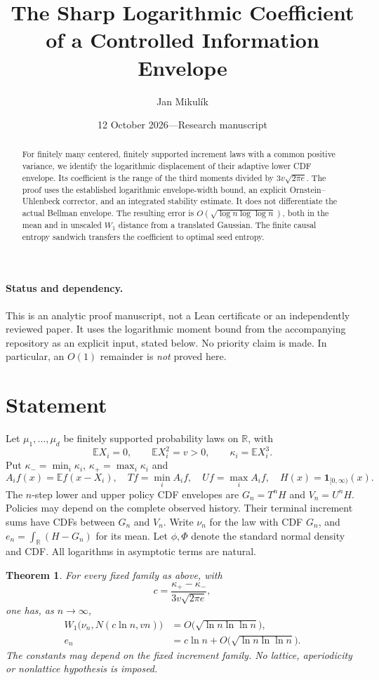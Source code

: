 \documentclass[11pt]{article}
\title{The Sharp Logarithmic Coefficient\protect\\of a Controlled Information Envelope}
\author{Jan Mikul\'ik}
\date{12 October 2026\quad---\quad Research manuscript}
\newtheorem{theorem}{Theorem}
\newcommand{\E}{\mathbb E}
\newcommand{\R}{\mathbb R}
\begin{document}
\maketitle
\begin{abstract}
For finitely many centered, finitely supported increment laws with a
common positive variance, we identify the logarithmic displacement of
their adaptive lower CDF envelope. Its coefficient is the range of the
third moments divided by $3v\sqrt{2\pi e}$. The proof uses the established
logarithmic envelope-width bound, an explicit Ornstein--Uhlenbeck
corrector, and an integrated stability estimate. It does not differentiate
the actual Bellman envelope. The resulting error is
$O(\sqrt{\log n\log\log n})$, both in the mean and in unscaled
$W_1$ distance from a translated Gaussian. The finite causal entropy
sandwich transfers the coefficient to optimal seed entropy.
\end{abstract}

\paragraph{Status and dependency.}
This is an analytic proof manuscript, not a Lean certificate or an
independently reviewed paper. It uses the logarithmic moment bound from
the accompanying repository as an explicit input, stated below.
No priority claim is made. In particular, an $O(1)$ remainder is
\emph{not} proved here.

\section{Statement}
Let $\mu_1,\ldots,\mu_d$ be finitely supported probability laws on $\R$,
with
\[
 \E X_i=0,\qquad \E X_i^2=v>0,\qquad
 \kappa_i=\E X_i^3.
\]
Put $\kappa_- =\min_i\kappa_i$, $\kappa_+=\max_i\kappa_i$ and
\[
 A_i f(x)=\E f(x-X_i),\quad Tf=\min_i A_i f,\quad
 Uf=\max_i A_i f,\quad H(x)=\mathbf1_{[0,\infty)}(x).
\]
The $n$-step lower and upper policy CDF envelopes are
$G_n=T^nH$ and $V_n=U^nH$. Policies may depend on the complete observed
history. Their terminal increment sums have CDFs between $G_n$ and $V_n$.
Write $\nu_n$ for the law with CDF $G_n$, and
$e_n=\int_\R(H-G_n)$ for its mean. Let $\phi,\Phi$ denote the standard
normal density and CDF. All logarithms in asymptotic terms are natural.

\begin{theorem}\label{thm:main}
For every fixed family as above, with
\begin{equation}\label{eq:c}
 c=\frac{\kappa_+-\kappa_-}{3v\sqrt{2\pi e}},
\end{equation}
one has, as $n\to\infty$,
\begin{align}
 W_1\bigl(\nu_n,N(c\ln n,vn)\bigr)
   &=O\bigl(\sqrt{\ln n\ln\ln n}\bigr),\label{eq:W1}\\
 e_n&=c\ln n+O\bigl(\sqrt{\ln n\ln\ln n}\bigr).
 \label{eq:mean}
\end{align}
The constants may depend on the fixed increment family. No lattice,
aperiodicity or nonlattice hypothesis is imposed.
\end{theorem}
\end{document}
